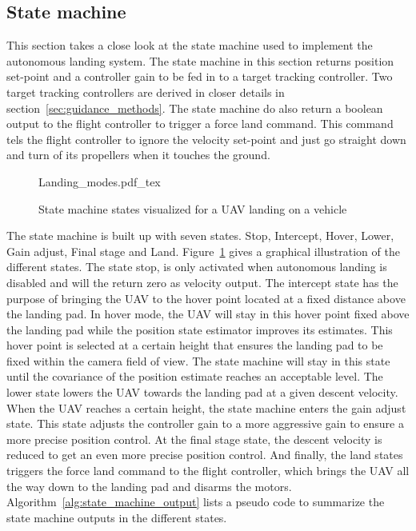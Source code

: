 \subsection{State machine} %
\label{sub:state_machine}
This section takes a close look at the state machine used to implement the autonomous landing system. The state machine in this section returns position set-point and a controller gain to be fed in to a target tracking controller. Two target tracking controllers are derived in closer details in section~\ref{sec:guidance_methods}. The state machine do also return a boolean output to the flight controller to trigger a force land command. This command tels the flight controller to ignore the velocity set-point and just go straight down and turn of its propellers when it touches the ground.

\begin{figure}[ht]
	\begin{center}
		\def\svgwidth{0.70\columnwidth}%
		{Landing_modes.pdf_tex}
        \caption{State machine states visualized for a UAV landing on a vehicle}
        \label{fig:landing_modes}
	\end{center}
\end{figure}

The state machine is built up with seven states. Stop, Intercept, Hover, Lower, Gain adjust, Final stage and Land. Figure~\ref{fig:landing_modes} gives a graphical illustration of the different states. The state stop, is only activated when autonomous landing is disabled and will the return zero as velocity output. The intercept state has the purpose of bringing the UAV to the hover point located at a fixed distance above the landing pad. In hover mode, the UAV will stay in this hover point fixed above the landing pad while the position state estimator improves its estimates. This hover point is selected at a certain height that ensures the landing pad to be fixed within the camera field of view. The state machine will stay in this state until the covariance of the position estimate reaches an acceptable level. The lower state lowers the UAV towards the landing pad at a given descent velocity. When the UAV reaches a certain height, the state machine enters the gain adjust state. This state adjusts the controller gain to a more aggressive gain to ensure a more precise position control. At the final stage state, the descent velocity is reduced to get an even more precise position control. And finally, the land states triggers the force land command to the flight controller, which brings the UAV all the way down to the landing pad and disarms the motors. Algorithm~\ref{alg:state_machine_output} lists a pseudo code to summarize the state machine outputs in the different states.

